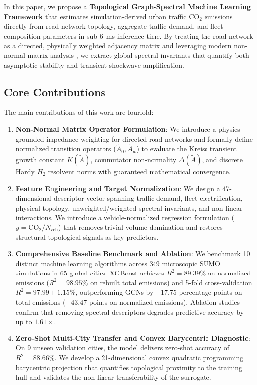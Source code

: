 \documentclass[journal]{IEEEtran}
\begin{document}
In this paper, we propose a \textbf{Topological Graph-Spectral Machine Learning Framework} that estimates simulation-derived urban traffic $\text{CO}_2$ emissions directly from road network topology, aggregate traffic demand, and fleet composition parameters in sub-6~ms inference time. By treating the road network as a directed, physically weighted adjacency matrix and leveraging modern non-normal matrix analysis \cite{Trefethen2005}, we extract global spectral invariants that quantify both asymptotic stability and transient shockwave amplification.

\subsection{Core Contributions}
The main contributions of this work are fourfold:
\begin{enumerate}
    \item \textbf{Non-Normal Matrix Operator Formulation}: We introduce a physics-grounded impedance weighting for directed road networks and formally define normalized transition operators ($\tilde{A}_0, \tilde{A}_w$) to evaluate the Kreiss transient growth constant $K(\tilde{A})$, commutator non-normality $\Delta(\tilde{A})$, and discrete Hardy $H_2$ resolvent norms with guaranteed mathematical convergence.
    \item \textbf{Feature Engineering and Target Normalization}: We design a 47-dimensional descriptor vector spanning traffic demand, fleet electrification, physical topology, unweighted/weighted spectral invariants, and non-linear interactions. We introduce a vehicle-normalized regression formulation ($y = \text{CO}_2 / N_{\text{veh}}$) that removes trivial volume domination and restores structural topological signals as key predictors.
    \item \textbf{Comprehensive Baseline Benchmark and Ablation}: We benchmark 10 distinct machine learning algorithms across 349 microscopic SUMO simulations in 65 global cities. XGBoost achieves $R^2 = 89.39\%$ on normalized emissions ($R^2 = 98.95\%$ on rebuilt total emissions) and 5-fold cross-validation $R^2 = 97.99 \pm 1.15\%$, outperforming GCNs by $+17.75$ percentage points on total emissions (+43.47 points on normalized emissions). Ablation studies confirm that removing spectral descriptors degrades predictive accuracy by up to $1.61\times$.
    \item \textbf{Zero-Shot Multi-City Transfer and Convex Barycentric Diagnostic}: On 9 unseen validation cities, the model delivers zero-shot accuracy of $R^2 = 88.66\%$. We develop a 21-dimensional convex quadratic programming barycentric projection that quantifies topological proximity to the training hull and validates the non-linear transferability of the surrogate.
\end{enumerate}
\end{document}
